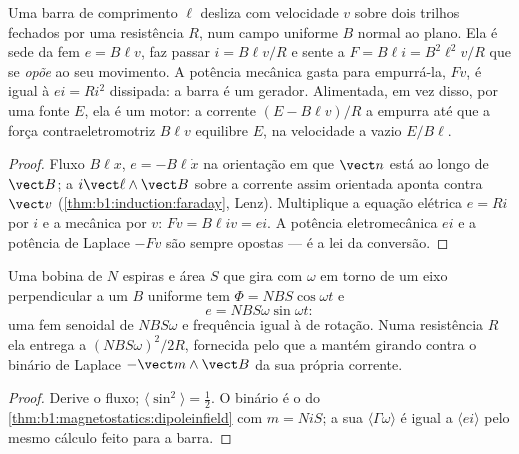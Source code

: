 \begin{proposition}\label{prop:b1:induction:rails}
Uma barra de comprimento $\ell$ desliza com velocidade $v$ sobre dois trilhos fechados por uma
resistência $R$, num campo uniforme $B$ normal ao plano. Ela é
sede da fem $e = B\ell v$, faz passar $i = B\ell v/R$ e sente a
 $F = B\ell i = B^2\ell^2v/R$ que se \emph{opõe} ao seu movimento.
A potência mecânica gasta para empurrá-la, $Fv$, é igual à  $ei = Ri^2$ dissipada: a barra é um gerador. Alimentada, em vez disso, por uma
fonte $E$, ela é um motor: a corrente $(E - B\ell v)/R$ a empurra
até que a força contraeletromotriz $B\ell v$ equilibre $E$, na velocidade a vazio $E/B\ell$.
\end{proposition}

\begin{proof}
Fluxo $B\ell x$, $e = -B\ell\dot x$ na orientação em que $\vect n$ está
ao longo de $\vect B$; a  $i\vect\ell\wedge\vect B$ sobre a corrente
assim orientada aponta contra $\vect v$ (\cref{thm:b1:induction:faraday},
Lenz). Multiplique a equação elétrica $e = Ri$ por $i$ e a
mecânica por $v$: $Fv = B\ell iv = ei$. A potência eletromecânica
$ei$ e a potência de Laplace $-Fv$ são sempre opostas --- é a lei
da conversão.
\end{proof}

\begin{proposition}\label{prop:b1:induction:alternator}
Uma bobina de $N$ espiras e área $S$ que gira com  $\omega$ em torno de um eixo
perpendicular a um $B$ uniforme tem $\Phi = NBS\cos\omega t$ e
\[
e = NBS\omega\sin\omega t :
\]
uma fem senoidal de  $NBS\omega$ e frequência igual à de rotação.
Numa resistência $R$ ela entrega a  $(NBS\omega)^2/2R$,
fornecida pelo  que a mantém girando contra o binário de Laplace
$-\vect m\wedge\vect B$ da sua própria corrente.
\end{proposition}

\begin{proof}
Derive o fluxo; $\langle\sin^2\rangle = \tfrac12$. O binário é o do
\cref{thm:b1:magnetostatics:dipoleinfield} com $m = Ni S$; a sua  $\langle\Gamma\omega\rangle$ é igual a $\langle ei\rangle$ pelo mesmo
cálculo feito para a barra.
\end{proof}

